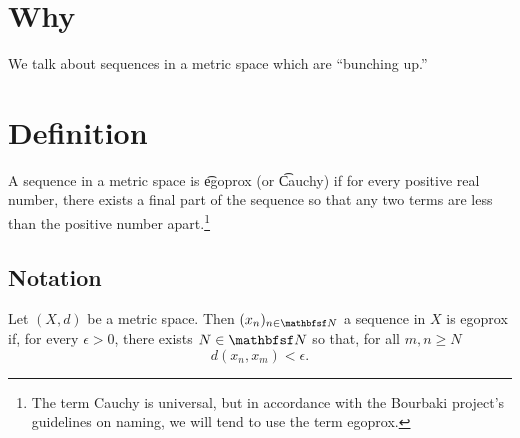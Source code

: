 
\section*{Why}

We talk about sequences in a metric space which are ``bunching up.''

\section*{Definition}

A sequence in a metric space is \t{egoprox} (or \t{Cauchy}) if for every positive real number, there exists a final part of the sequence so that any two terms are less than the positive number apart.\footnote{The term Cauchy is universal, but in accordance with the Bourbaki project's guidelines on naming, we will tend to use the term egoprox.}

\subsection*{Notation}

Let $(X, d)$ be a metric space.
Then $(x_n)_{n \in \N  }$ a sequence in $X$ is egoprox if, for every $\epsilon  > 0$, there exists $N \in \N  $ so that, for all $m, n \geq N$
\[
d(x_n, x_m) < \epsilon .
\]

\blankpage